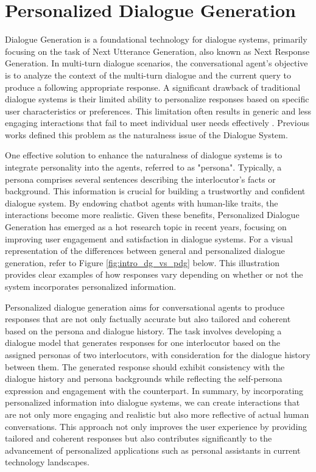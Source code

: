 
\section{Personalized Dialogue Generation}
Dialogue Generation is a foundational technology for dialogue systems, primarily focusing on the task of Next Utterance Generation, also known as Next Response Generation. In multi-turn dialogue scenarios, the conversational agent's objective is to analyze the context of the multi-turn dialogue and the current query to produce a following appropriate response. A significant drawback of traditional dialogue systems is their limited ability to personalize responses based on specific user characteristics or preferences. This limitation often results in generic and less engaging interactions that fail to meet individual user needs effectively \cite{jiang-de-rijke-2018-sequence}. Previous works \cite{song-etal-2020-generating} \cite{warren-2006-features} defined this problem as the naturalness issue of the Dialogue System.

One effective solution to enhance the naturalness of dialogue systems is to integrate personality into the agents, referred to as "persona". Typically, a persona comprises several sentences describing the interlocutor's facts or background. This information is crucial for building a trustworthy and confident dialogue system. By endowing chatbot agents with human-like traits, the interactions become more realistic. Given these benefits, Personalized Dialogue Generation has emerged as a hot research topic in recent years, focusing on improving user engagement and satisfaction in dialogue systems. For a visual representation of the differences between general and personalized dialogue generation, refer to Figure \ref{fig:intro_dg_vs_pdg} below. This illustration provides clear examples of how responses vary depending on whether or not the system incorporates personalized information.

Personalized dialogue generation aims for conversational agents to produce responses that are not only factually accurate but also tailored and coherent based on the persona and dialogue history. The task involves developing a dialogue model that generates responses for one interlocutor based on the assigned personas of two interlocutors, with consideration for the dialogue history between them. The generated response should exhibit consistency with the dialogue history and persona backgrounds while reflecting the self-persona expression and engagement with the counterpart. In summary, by incorporating personalized information into dialogue systems, we can create interactions that are not only more engaging and realistic but also more reflective of actual human conversations. This approach not only improves the user experience by providing tailored and coherent responses but also contributes significantly to the advancement of personalized applications such as personal assistants in current technology landscapes.

